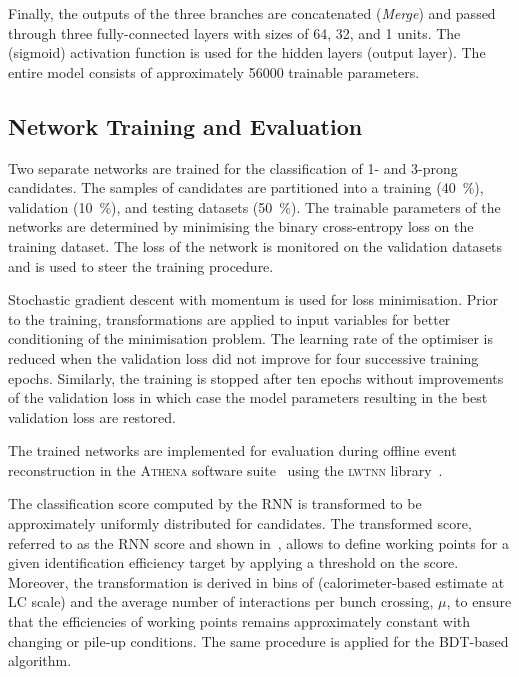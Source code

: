 Finally, the outputs of the three branches are concatenated
(\emph{Merge}) and passed through three fully-connected layers with
sizes of 64, 32, and 1 units. The \ReLU (sigmoid) activation function
is used for the hidden layers (output layer). The entire model
consists of approximately \num{56000} trainable parameters.


\subsection{Network Training and Evaluation}

Two separate networks are trained for the classification of 1- and
3-prong \tauhadvis candidates. The samples of \tauhadvis candidates
are partitioned into a training (\SI{40}{\percent}), validation
(\SI{10}{\percent}), and testing datasets (\SI{50}{\percent}). The
trainable parameters of the networks are determined by minimising the
binary cross-entropy loss on the training dataset. The loss of the
network is monitored on the validation datasets and is used to steer
the training procedure.

Stochastic gradient descent with momentum is used for loss
minimisation. Prior to the training, transformations are applied to
input variables for better conditioning of the minimisation
problem. The learning rate of the optimiser is reduced when the
validation loss did not improve for four successive training
epochs. Similarly, the training is stopped after ten epochs without
improvements of the validation loss in which case the model parameters
resulting in the best validation loss are restored.

The trained networks are implemented for evaluation during offline
event reconstruction in the \textsc{Athena} software
suite~\cite{ATL-SOFT-PUB-2021-001} using the \textsc{lwtnn}
library~\cite{lwtnn}.

The classification score computed by the RNN \tauid is transformed to
be approximately uniformly distributed for \truetauhadvis
candidates. The transformed score, referred to as the RNN score and
shown in~, allows to define working
points for a given \truetauhadvis identification efficiency target by
applying a threshold on the score. Moreover, the transformation is
derived in bins of \tauhadvis \pT (calorimeter-based \pT estimate at
LC scale) and the average number of interactions per bunch crossing,
$\mu$, to ensure that the \truetauhadvis efficiencies of working
points remains approximately constant with changing \tauhadvis \pT or
pile-up conditions. The same procedure is applied for the BDT-based
\tauid algorithm.

